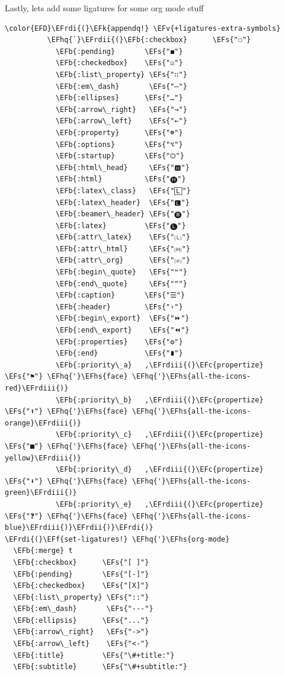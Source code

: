 \documentclass{scrartcl}
\newcommand{\EFk}[1]{\textcolor{EFk}{#1}} %
\newcommand{\EFs}[1]{\textcolor{EFs}{#1}} %
\newcommand{\EFb}[1]{\textcolor{EFb}{#1}} %
\newcommand{\EFc}[1]{\textcolor{EFc}{#1}} %
\newcommand{\EFv}[1]{\textcolor{EFv}{#1}} %
\newcommand{\EFf}[1]{\textcolor{EFf}{#1}} %
\newcommand{\EFhq}[1]{#1} %
\newcommand{\EFhs}[1]{#1} %
\newcommand{\EFrdi}[1]{#1} %
\newcommand{\EFrdii}[1]{#1} %
\newcommand{\EFrdiii}[1]{#1} %
\begin{document}
Lastly, lets add some ligatures for some org mode stuff
\begin{Code}
\begin{Verbatim}[]
\color{EFD}\EFrdi{(}\EFk{appendq!} \EFv{+ligatures-extra-symbols}
          \EFhq{`}\EFrdii{(}\EFb{:checkbox}      \EFs{"☐"}
            \EFb{:pending}       \EFs{"◼"}
            \EFb{:checkedbox}    \EFs{"☑"}
            \EFb{:list\_property} \EFs{"∷"}
            \EFb{:em\_dash}       \EFs{"—"}
            \EFb{:ellipses}      \EFs{"…"}
            \EFb{:arrow\_right}   \EFs{"→"}
            \EFb{:arrow\_left}    \EFs{"←"}
            \EFb{:property}      \EFs{"☸"}
            \EFb{:options}       \EFs{"⌥"}
            \EFb{:startup}       \EFs{"⏻"}
            \EFb{:html\_head}     \EFs{"🅷"}
            \EFb{:html}          \EFs{"🅗"}
            \EFb{:latex\_class}   \EFs{"🄻"}
            \EFb{:latex\_header}  \EFs{"🅻"}
            \EFb{:beamer\_header} \EFs{"🅑"}
            \EFb{:latex}         \EFs{"🅛"}
            \EFb{:attr\_latex}    \EFs{"🄛"}
            \EFb{:attr\_html}     \EFs{"🄗"}
            \EFb{:attr\_org}      \EFs{"⒪"}
            \EFb{:begin\_quote}   \EFs{"❝"}
            \EFb{:end\_quote}     \EFs{"❞"}
            \EFb{:caption}       \EFs{"☰"}
            \EFb{:header}        \EFs{"›"}
            \EFb{:begin\_export}  \EFs{"⏩"}
            \EFb{:end\_export}    \EFs{"⏪"}
            \EFb{:properties}    \EFs{"⚙"}
            \EFb{:end}           \EFs{"∎"}
            \EFb{:priority\_a}   ,\EFrdiii{(}\EFc{propertize} \EFs{"⚑"} \EFhq{'}\EFhs{face} \EFhq{'}\EFhs{all-the-icons-red}\EFrdiii{)}
            \EFb{:priority\_b}   ,\EFrdiii{(}\EFc{propertize} \EFs{"⬆"} \EFhq{'}\EFhs{face} \EFhq{'}\EFhs{all-the-icons-orange}\EFrdiii{)}
            \EFb{:priority\_c}   ,\EFrdiii{(}\EFc{propertize} \EFs{"■"} \EFhq{'}\EFhs{face} \EFhq{'}\EFhs{all-the-icons-yellow}\EFrdiii{)}
            \EFb{:priority\_d}   ,\EFrdiii{(}\EFc{propertize} \EFs{"⬇"} \EFhq{'}\EFhs{face} \EFhq{'}\EFhs{all-the-icons-green}\EFrdiii{)}
            \EFb{:priority\_e}   ,\EFrdiii{(}\EFc{propertize} \EFs{"❓"} \EFhq{'}\EFhs{face} \EFhq{'}\EFhs{all-the-icons-blue}\EFrdiii{)}\EFrdii{)}\EFrdi{)}
\EFrdi{(}\EFf{set-ligatures!} \EFhq{'}\EFhs{org-mode}
  \EFb{:merge} t
  \EFb{:checkbox}      \EFs{"[ ]"}
  \EFb{:pending}       \EFs{"[-]"}
  \EFb{:checkedbox}    \EFs{"[X]"}
  \EFb{:list\_property} \EFs{"::"}
  \EFb{:em\_dash}       \EFs{"---"}
  \EFb{:ellipsis}      \EFs{"..."}
  \EFb{:arrow\_right}   \EFs{"->"}
  \EFb{:arrow\_left}    \EFs{"<-"}
  \EFb{:title}         \EFs{"\#+title:"}
  \EFb{:subtitle}      \EFs{"\#+subtitle:"}

\end{Verbatim}
\end{Code}
\end{document}
